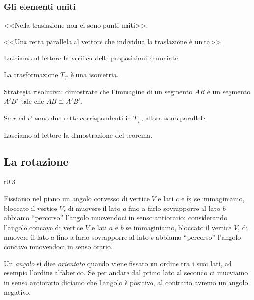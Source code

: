 \subsubsection{Gli elementi uniti}

\begin{itemize*}
\item <<Nella traslazione non ci sono punti uniti>>.
\item <<Una retta parallela al vettore che individua la traslazione è 
unita>>.
\end{itemize*}

Lasciamo al lettore la verifica delle proposizioni enunciate.

\begin{teorema}
La trasformazione $T_{\vec{v}}$ è una isometria.
\end{teorema}

Strategia risolutiva: dimostrate che l'immagine di un segmento $AB$ è 
un segmento $A'B'$ tale che $AB\cong A'B'$.

\begin{teorema}
Se $r$ ed $r'$ sono due rette corrispondenti in $T_{\vec{v}}$, allora 
sono parallele.
\end{teorema}

Lasciamo al lettore la dimostrazione del teorema.
\pagebreak

\subsection{La rotazione}

\setlength{\intextsep}{3pt plus 2.0pt minus 2.0pt}
\begin{wrapfigure}{r}{0.3\textwidth}
	\centering
\end{wrapfigure}
Fissiamo nel piano un angolo convesso di vertice $V$ e lati $a$ e 
$b$; se immaginiamo, bloccato il vertice $V$, di muovere il lato $a$ 
fino a farlo sovrapporre al lato $b$ abbiamo ``percorso'' l'angolo 
muovendoci in senso antiorario; considerando l'angolo concavo di 
vertice $V$ e lati $a$ e $b$ se immaginiamo, bloccato il vertice $V$, 
di muovere il lato $a$ fino a farlo sovrapporre al lato $b$ abbiamo 
``percorso'' l'angolo concavo muovendoci in senso orario.

\begin{definizione}
Un \emph{angolo} si dice \emph{orientato} quando viene fissato un 
ordine tra i suoi lati, ad esempio l'ordine alfabetico. Se per andare 
dal primo lato al secondo ci muoviamo in senso antiorario diciamo che 
l'angolo è positivo, al contrario avremo un angolo negativo.
\end{definizione}


